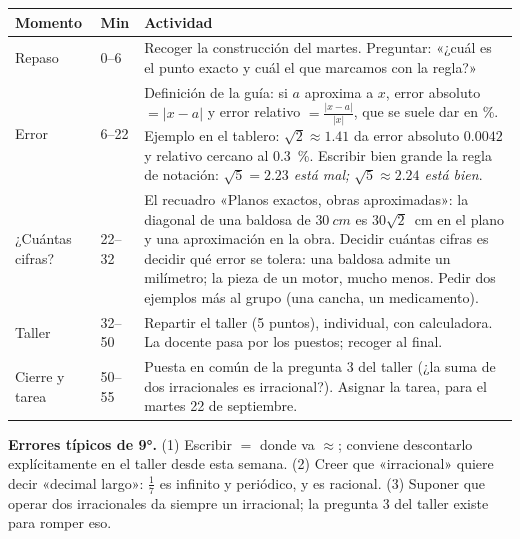 \documentclass[11pt]{article}
\begin{document}
\begin{center}
{\renewcommand{\arraystretch}{1.3}
\begin{tabularx}{\linewidth}{@{}l l X@{}}
  \toprule
  \textbf{Momento} & \textbf{Min} & \textbf{Actividad}\\
  \midrule
  Repaso & 0--6 & Recoger la construcción del martes. Preguntar: «¿cuál es el punto
    exacto y cuál el que marcamos con la regla?»\\
  Error & 6--22 & Definición de la guía: si $a$ aproxima a $x$, error absoluto
    $= |x - a|$ y error relativo $= \frac{|x - a|}{|x|}$, que se suele dar en \%.
    Ejemplo en el tablero: $\sqrt{2} \approx \num{1,41}$ da error absoluto
    $\num{0,0042}$ y relativo cercano al \qty{0,3}{\percent}. Escribir bien grande la regla de
    notación: \emph{$\sqrt{5} = \num{2,23}$ está mal; $\sqrt{5} \approx \num{2,24}$ está
    bien}.\\
  ¿Cuántas cifras? & 22--32 & El recuadro «Planos exactos, obras aproximadas»: la diagonal
    de una baldosa de $\qty{30}{cm}$ es $30\sqrt{2}$~cm en el plano y una aproximación en
    la obra. Decidir cuántas cifras es decidir qué error se tolera: una baldosa admite un
    milímetro; la pieza de un motor, mucho menos. Pedir dos ejemplos más al grupo (una
    cancha, un medicamento).\\
  Taller & 32--50 & Repartir el taller (5 puntos), individual, con calculadora. La docente
    pasa por los puestos; recoger al final.\\
  Cierre y tarea & 50--55 & Puesta en común de la pregunta 3 del taller (¿la suma de dos
    irracionales es irracional?). Asignar la tarea, para el martes 22 de septiembre.\\
  \bottomrule
\end{tabularx}}
\end{center}

\begin{nota}
\textbf{Errores típicos de 9°.} (1) Escribir $=$ donde va $\approx$; conviene descontarlo
explícitamente en el taller desde esta semana. (2) Creer que «irracional» quiere decir
«decimal largo»: $\frac{1}{7}$ es infinito y periódico, y es racional. (3) Suponer que
operar dos irracionales da siempre un irracional; la pregunta 3 del taller existe para
romper eso.
\end{nota}
\end{document}
